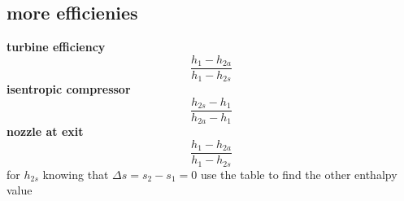 \documentclass[14pt]{article}
\begin{document}
\subsection{more efficienies}
\textbf{turbine efficiency}
\begin{equation}
   \frac{h_1 - h_{2a}}{h_1 - h_{2s}}
\end{equation}
\textbf{isentropic compressor}
\begin{equation}
   \frac{h_{2s} - h_1}{h_{2a} - h_1}
\end{equation}
\textbf{nozzle at exit}
\begin{equation}
   \frac{h_1 - h_{2a}}{h_1 - h_{2s}}
\end{equation}
for $h_{2s}$ knowing that $\Delta s = s_2 - s_1 = 0$ use the table to find the other enthalpy value
\end{document}
